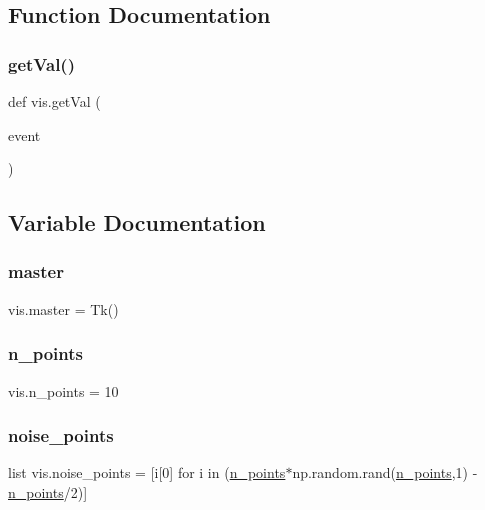 \subsection{Function Documentation}
\mbox{\label{namespacevis_a987b76332d0d03b66af97331e5e4b442}} 
\subsubsection{\texorpdfstring{get\+Val()}{getVal()}}
{\footnotesize\ttfamily def vis.\+get\+Val (\begin{DoxyParamCaption}\item[{}]{event }\end{DoxyParamCaption})}



\subsection{Variable Documentation}
\mbox{\label{namespacevis_a6ee13a8bd702057064f342e00fe8eefd}} 
\subsubsection{\texorpdfstring{master}{master}}
{\footnotesize\ttfamily vis.\+master = Tk()}

\mbox{\label{namespacevis_a670f391917319e53a1373004ad47a325}} 
\subsubsection{\texorpdfstring{n\+\_\+points}{n\_points}}
{\footnotesize\ttfamily vis.\+n\+\_\+points = 10}

\mbox{\label{namespacevis_ac930396acd65d715184cfd4ae2df301c}} 
\subsubsection{\texorpdfstring{noise\+\_\+points}{noise\_points}}
{\footnotesize\ttfamily list vis.\+noise\+\_\+points = \mbox{[}i\mbox{[}0\mbox{]} for i in (\hyperlink{namespacevis_a670f391917319e53a1373004ad47a325}{n\+\_\+points}$\ast$np.\+random.\+rand(\hyperlink{namespacevis_a670f391917319e53a1373004ad47a325}{n\+\_\+points},1) -\/ \hyperlink{namespacevis_a670f391917319e53a1373004ad47a325}{n\+\_\+points}/2)\mbox{]}}

